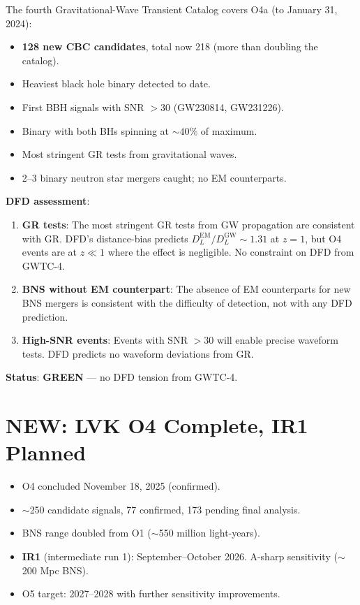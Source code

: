 \documentclass[11pt,a4paper]{article}
\newcommand{\GREEN}{\textcolor{dfdgreen}{\textbf{GREEN}}}
\newcommand{\NEW}{\textcolor{dfdblue}{\textbf{NEW}}}
\begin{document}
\begin{tcolorbox}[colback=blue!5!white, colframe=blue!60!black,
  title={GWTC-4.0 (arXiv:2508.18080; March 2026): Catalog Doubled}]

The fourth Gravitational-Wave Transient Catalog covers O4a (to January 31, 2024):
\begin{itemize}
\item \textbf{128 new CBC candidates}, total now 218 (more than doubling the catalog).
\item Heaviest black hole binary detected to date.
\item First BBH signals with SNR $> 30$ (GW230814, GW231226).
\item Binary with both BHs spinning at $\sim 40\%$ of maximum.
\item Most stringent GR tests from gravitational waves.
\item 2--3 binary neutron star mergers caught; no EM counterparts.
\end{itemize}

\textbf{DFD assessment}:
\begin{enumerate}
\item \textbf{GR tests}: The most stringent GR tests from GW propagation are consistent with GR. DFD's distance-bias predicts $D_L^{\text{EM}}/D_L^{\text{GW}} \sim 1.31$ at $z = 1$, but O4 events are at $z \ll 1$ where the effect is negligible. No constraint on DFD from GWTC-4.
\item \textbf{BNS without EM counterpart}: The absence of EM counterparts for new BNS mergers is consistent with the difficulty of detection, not with any DFD prediction.
\item \textbf{High-SNR events}: Events with SNR $> 30$ will enable precise waveform tests. DFD predicts no waveform deviations from GR.
\end{enumerate}

\textbf{Status}: \GREEN{} --- no DFD tension from GWTC-4.
\end{tcolorbox}

\section{\NEW: LVK O4 Complete, IR1 Planned}

\begin{itemize}
\item O4 concluded November 18, 2025 (confirmed).
\item $\sim$250 candidate signals, 77 confirmed, 173 pending final analysis.
\item BNS range doubled from O1 ($\sim$550 million light-years).
\item \textbf{IR1} (intermediate run 1): September--October 2026. A-sharp sensitivity ($\sim$200 Mpc BNS).
\item O5 target: 2027--2028 with further sensitivity improvements.
\end{itemize}
\end{document}
